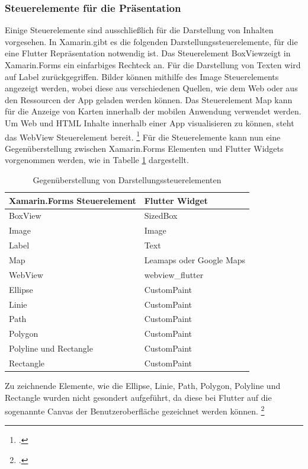 \subsubsection{Steuerelemente für die Präsentation}
Einige Steuerelemente sind ausschließlich für die Darstellung von Inhalten vorgesehen.  In Xamarin.\@Forms gibt es die folgenden  Darstellungssteuerelemente, für die eine Flutter Repräsentation notwendig ist.  Das Steuerelement \glq BoxView\grq{}zeigt in Xamarin.Forms ein einfarbiges Rechteck an.  Für die Darstellung von Texten wird auf \glq Label\grq{} zurückgegriffen.  Bilder können mithilfe des \glq Image\grq{}  Steuerelements angezeigt werden,  wobei diese aus verschiedenen Quellen, wie dem Web oder aus den Ressourcen der App geladen werden können.  Das Steuerelement \glq Map\grq{}  kann für die Anzeige von Karten innerhalb der mobilen Anwendung verwendet werden.  Um Web und HTML Inhalte innerhalb einer App visualisieren zu können, steht das \glq WebView\grq{}  Steuerelement bereit.  \footcite[Vgl.][Abgerufen am \today]{MicrosoftXamLayouts2018} Für die Steuerelemente kann nun eine Gegenüberstellung zwischen Xamarin.Forms Elementen und Flutter Widgets vorgenommen werden,  wie in Tabelle \ref{tab:ControlsVisualization} dargestellt.

\begin{table}[!ht]
\begin{tabularx}{\textwidth}{|X|X|}
\hline
   \textbf{Xamarin.Forms Steuerelement} & \textbf{Flutter Widget}  \\
\hline
	BoxView		       			&   	 SizedBox  		\\ 
	Image       						&	     Image	 			\\ 
	Label       						&  	Text 					\\ 
	Map            					&	   	Leamaps oder Google Maps \\ 
	WebView            			&  	webview\_flutter	\\ 
	Ellipse							&  	CustomPaint	\\ 
	Linie								&	  	CustomPaint	\\ 
	Path  							&  	CustomPaint	\\ 
	Polygon  						&  	CustomPaint	\\ 
	Polyline und Rectangle  &  	CustomPaint	\\ 
	Rectangle  					&  	CustomPaint	\\ 
\hline
\end{tabularx}
\caption{Gegenüberstellung von Darstellungssteuerelementen}
 \label{tab:ControlsVisualization}
\end{table}
Zu zeichnende Elemente, wie die  \glq Ellipse\grq{}, \glq Linie\grq{}, \glq Path\grq{},  \glq Polygon\grq{},  \glq Polyline\grq{}  und \glq Rectangle\grq{} wurden nicht gesondert aufgeführt,  da diese bei Flutter auf die sogenannte Canvas der Benutzeroberfläche gezeichnet werden können.  \footcite[Vgl.][Abgerufen am \today]{GoogleFlutterCanvas2020} 

